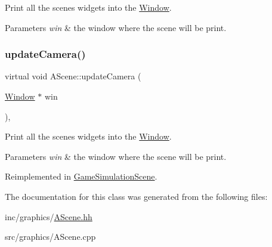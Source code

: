 Print all the scene\textquotesingle{}s widgets into the \hyperlink{classWindow}{Window}. 


\begin{DoxyParams}{Parameters}
{\em \textquotesingle{}win\textquotesingle{}} & the window where the scene will be print. \\
\hline
\end{DoxyParams}
\mbox{\label{classAScene_a18070899d965f1811c2253ad1d939374}} 
\subsubsection{\texorpdfstring{update\+Camera()}{updateCamera()}}
{\footnotesize\ttfamily virtual void A\+Scene\+::update\+Camera (\begin{DoxyParamCaption}\item[{\hyperlink{classWindow}{Window} $\ast$}]{win }\end{DoxyParamCaption})\hspace{0.3cm}{\ttfamily [inline]}, {\ttfamily [virtual]}}



Print all the scene\textquotesingle{}s widgets into the \hyperlink{classWindow}{Window}. 


\begin{DoxyParams}{Parameters}
{\em \textquotesingle{}win\textquotesingle{}} & the window where the scene will be print. \\
\hline
\end{DoxyParams}


Reimplemented in \hyperlink{classGameSimulationScene_a66b107f708b5eed87a3c0a0016541d29}{Game\+Simulation\+Scene}.



The documentation for this class was generated from the following files\+:\begin{DoxyCompactItemize}
\item 
inc/graphics/\hyperlink{AScene_8hh}{A\+Scene.\+hh}\item 
src/graphics/A\+Scene.\+cpp\end{DoxyCompactItemize}
